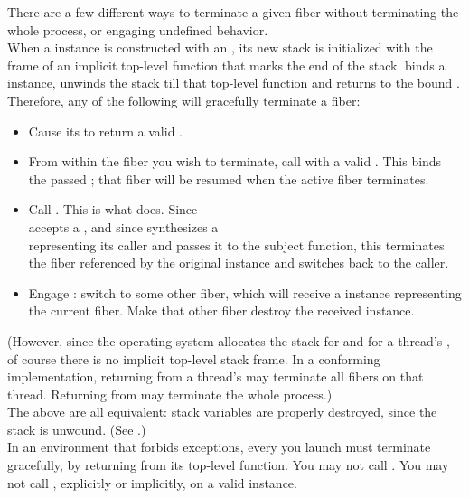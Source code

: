 
There are a few different ways to terminate a given fiber without
terminating the whole process, or engaging undefined behavior.\\

When a \fiber instance is constructed with an \entryfn, its new stack is
initialized with the frame of an implicit top-level function that marks the
end of the stack. \unwindfib binds a \fiber instance, unwinds the stack
till that top-level function and returns to the bound \fiber.\\

Therefore, any of the following will gracefully terminate a fiber:

\begin{itemize}
    \item Cause its \entryfn\xspace to return a valid \fiber.
    \item From within the fiber you wish to terminate, call \unwindfib with a
          valid \fiber. This binds the passed \fiber; that fiber will be resumed
          when the active fiber terminates.
    \item Call . This is what \dtor
          does. Since\\\unwindfib accepts a \fiber, and since \resumewith
          synthesizes a\\\fiber representing its caller and passes it to the
          subject function, this terminates the fiber referenced by the
          original \fiber instance and switches back to the caller.
    \item Engage \dtor: switch to some other fiber, which will
          receive a \fiber instance representing the current fiber. Make that
          other fiber destroy the received \fiber instance.
\end{itemize}

(However, since the operating system allocates the stack for \main and for a
thread's \entryfn, of course there is no implicit top-level stack frame. In
a conforming implementation, returning from a thread's \entryfn\xspace may
terminate all fibers on that thread. Returning from \main may terminate the
whole process.)\\

The above are all equivalent: stack variables are properly destroyed, since
the stack is unwound. (See .)\\

In an environment that forbids exceptions, every \fiber you launch must
terminate gracefully, by returning from its top-level function. You may not
call \unwindfib. You may not call \dtor, explicitly or implicitly, on a
valid \fiber instance.\\

